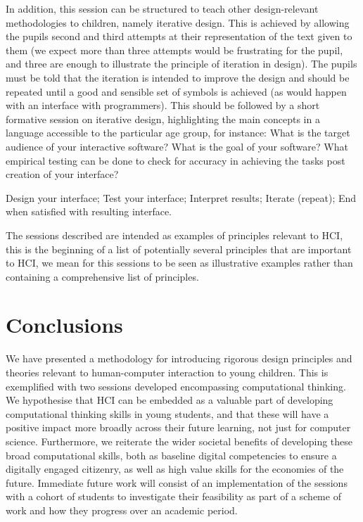 \documentclass{sig-alternate}
\begin{document}
In addition, this session can be structured to teach other
design-relevant methodologies to children, namely iterative
design. This is achieved by allowing the pupils second and third
attempts at their representation of the text given to them (we expect
more than three attempts would be frustrating for the pupil, and three
are enough to illustrate the principle of iteration in design). The
pupils must be told that the iteration is intended to improve the
design and should be repeated until a good and sensible set of symbols
is achieved (as would happen with an interface with programmers). This
should be followed by a short formative session on iterative design,
highlighting the main concepts in a language accessible to the
particular age group, for instance:
What is the target audience of your interactive software? What
  is the goal of your software? What empirical testing can be done to
  check for accuracy in achieving the tasks post creation of your
  interface?

Design your interface; Test your interface; Interpret results; Iterate (repeat); End when satisfied with resulting interface.

The sessions described are intended as examples of principles relevant
to HCI, this is the beginning of a list of potentially several
principles that are important to HCI, we mean for this sessions to be
seen as illustrative examples rather than containing a comprehensive
list of principles.


\section{Conclusions}

We have presented a methodology for introducing rigorous design
principles and theories relevant to human-computer interaction to
young children. This is exemplified with two sessions developed
encompassing computational thinking. We hypothesise that HCI can be
embedded as a valuable part of developing computational thinking
skills in young students, and that these will have a positive impact
more broadly across their future learning, not just for computer
science. Furthermore, we reiterate the wider societal benefits of
developing these broad computational skills, both as baseline digital
competencies to ensure a digitally engaged citizenry, as well as high
value skills for the economies of the future. Immediate future work
will consist of an implementation of the sessions with a cohort of
students to investigate their feasibility as part of a scheme of work
and how they progress over an academic period.
\end{document}
